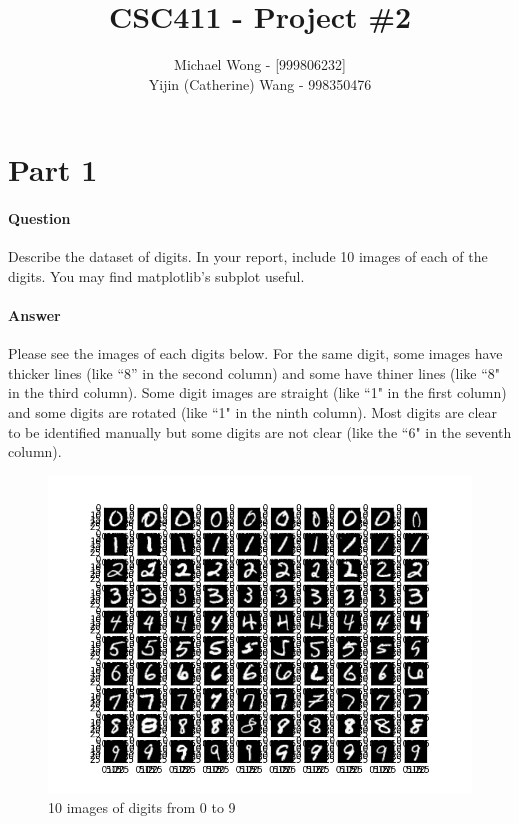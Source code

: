 \documentclass[11pt,twoside]{article}
\begin{document}
\title{CSC411 - Project \#2}
\author{Michael Wong - [999806232]\\Yijin (Catherine) Wang - 998350476}
\maketitle

\clearpage

\section*{Part 1}
\paragraph{Question}
Describe the dataset of digits. In your report, include 10 images of each of the digits. You may find matplotlib’s subplot useful.

\paragraph{Answer}
Please see the images of each digits below. For the same digit, some images have thicker lines (like ``8'' in the second column) and some have thiner lines (like ``8" in the third column). Some digit images are straight (like ``1" in the first column) and some digits are rotated (like ``1" in the ninth column). Most digits are clear to be identified manually but some digits are not clear (like the ``6" in the seventh column). 

\begin{figure}[h]
	\centering
	\includegraphics[scale=0.8]{part1.png}
	\caption*{10 images of digits from 0 to 9}
\end{figure}
\end{document}
